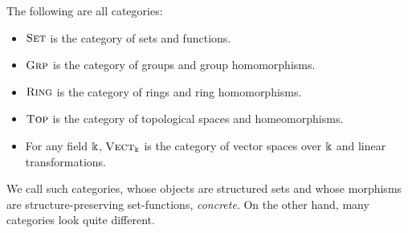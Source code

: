 \begin{ex}\label{ex:concrete categories}The following are all categories:
	\begin{itemize}
		\item ${\textsc{\text{Set}}}$ is the category of sets and functions.
		\item ${\textsc{\text{Grp}}}$ is the category of groups and group homomorphisms.
		\item ${\textsc{\text{Ring}}}$ is the category of rings and ring homomorphisms.
		\item ${\textsc{\text{Top}}}$ is the category of topological spaces and homeomorphisms.
		\item For any field $\Bbbk$, ${\textsc{\text{Vect}}}_\Bbbk$ is the category of vector
		      spaces over $\Bbbk$ and linear transformations.
	\end{itemize}
\end{ex}

\noindent
We call such categories, whose objects are structured sets and whose morphisms
are structure-preserving set-functions, \emph{concrete}. On the other hand, many
categories look quite different.

